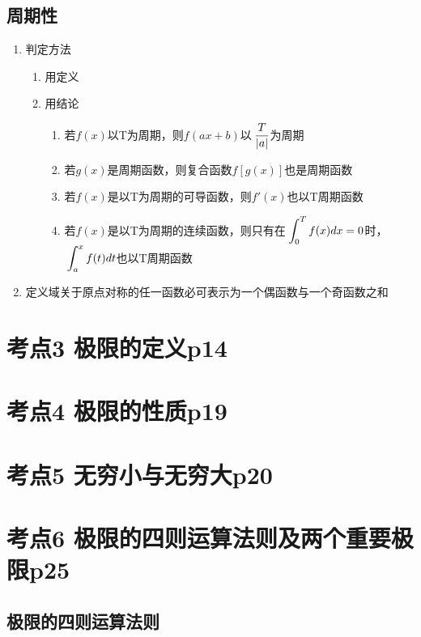 \subsection{周期性}

\begin{enumerate}
    \item 判定方法\begin{enumerate}
        \item 用定义
        \item 用结论\begin{enumerate}
            \item 若$f(x)$以T为周期，则$f(ax+b)$以$\displaystyle\hspace{.2em}\frac{T}{|a|}$为周期
            \item 若$g(x)$是周期函数，则复合函数$f[g(x)]$也是周期函数
            \item 若$f(x)$是以T为周期的可导函数，则$f'(x)$也以T周期函数
            \item 若$f(x)$是以T为周期的连续函数，则只有在$\displaystyle\hspace{.2em}\int_{0}^{T}f(x)dx=0$时，$\displaystyle\hspace{.2em}\int_{a}^{x}f(t)dt$也以T周期函数
        \end{enumerate}
    \end{enumerate}
    \item 定义域关于原点对称的任一函数必可表示为一个偶函数与一个奇函数之和
\end{enumerate}

\section{考点3 极限的定义p14}

\section{考点4 极限的性质p19}

\section{考点5 无穷小与无穷大p20}

\section{考点6 极限的四则运算法则及两个重要极限p25}

\subsection{极限的四则运算法则}

